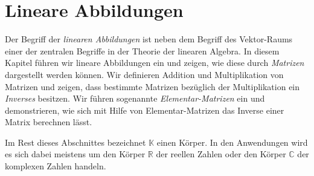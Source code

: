 \chapter{Lineare Abbildungen}
Der Begriff der \emph{linearen Abbildungen} ist neben dem Begriff des Vektor-Raums einer der zentralen Begriffe in der Theorie der
linearen Algebra.  In diesem Kapitel f\"{u}hren wir lineare Abbildungen ein und zeigen, wie diese
durch \emph{Matrizen} dargestellt werden k\"{o}nnen.  Wir definieren Addition und Multiplikation
von Matrizen und zeigen, dass bestimmte Matrizen bez\"{u}glich der Multiplikation ein \emph{Inverses} besitzen.
Wir f\"{u}hren sogenannte \emph{Elementar-Matrizen} ein und demonstrieren, wie sich mit Hilfe von
Elementar-Matrizen das Inverse einer Matrix berechnen l\"{a}sst.  

Im Rest dieses Abschnittes bezeichnet
$\mathbb{K}$ einen K\"{o}rper.  In den Anwendungen wird es sich dabei meistens um den K\"{o}rper
$\mathbb{R}$ der reellen Zahlen oder den K\"{o}rper $\mathbb{C}$ der komplexen Zahlen handeln.

